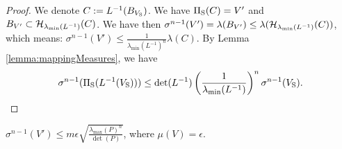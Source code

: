 \begin{proof}
We denote $C:= L^{-1}(B_{V_{\text{S}}})$. We have $\Pi_{\text{S}}(C) = V'$ and $B_{V'} \subset \mathcal{H}_{\lambda_{\min}(L^{-1})}(C)$.  We have then $\sigma^{n-1}(V') = \lambda(B_{V'}) \leq \lambda (\mathcal{H}_{\lambda_{\min}(L^{-1})}(C))$, which means: $\sigma^{n-1}(V') \leq \frac{1}{\lambda_{\min}(L^{-1})^n} \lambda(C)$. By Lemma \ref{lemma:mappingMeasures}, we have
\begin{equation*} \sigma^{n-1}(\Pi_{\text{S}}(L^{-1}(V_{\text{S}}))) \leq \det(L^{-1}) \left(\frac{1}{\lambda_{\min}(L^{-1})}\right)^n \sigma^{n-1}(V_{\text{S}}). \end{equation*}





\end{proof}

\begin{corollary}$\sigma^{n-1}(V') \leq m\epsilon \sqrt{\frac{\lambda_{\max}(P)^n}{\det(P)}}$,
where $\mu(V) = \epsilon$.
\end{corollary}



